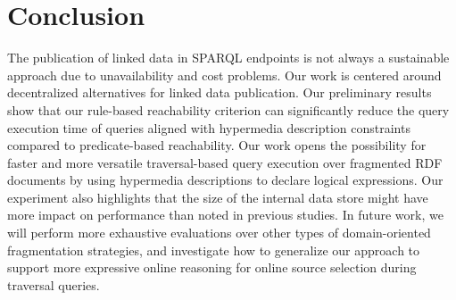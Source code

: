 \section{Conclusion}

The publication of linked data in SPARQL endpoints is not always a sustainable approach due to unavailability and cost problems.
Our work is centered around decentralized alternatives for linked data publication.
Our preliminary results show that our rule-based reachability criterion can significantly reduce the query execution time of queries aligned with hypermedia description constraints compared to predicate-based reachability.
Our work opens the possibility for faster and more versatile traversal-based query execution over fragmented RDF documents by using hypermedia descriptions to declare logical expressions.
Our experiment also highlights that the size of the internal data store might have more impact on performance than noted in previous studies.
In future work, we will perform more exhaustive evaluations over other types of domain-oriented fragmentation strategies,
and investigate how to generalize our approach to support more expressive online reasoning for online source selection during traversal queries.
